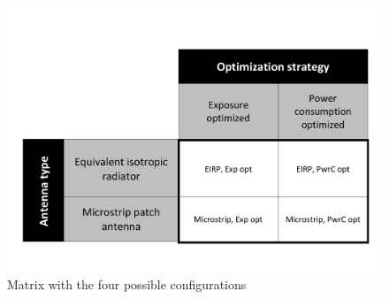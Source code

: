 \begin{figure}[h!]
  \includegraphics[width=\textwidth]{../images/fourCasesMatrix.pdf}
  \caption{Matrix with the four possible configurations}
  \label{fig:fourCasesMatrix}
\end{figure}

